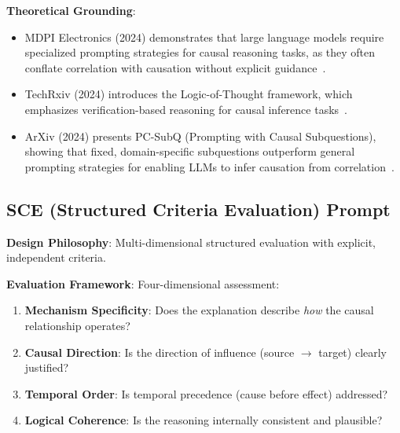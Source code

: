 \documentclass[11pt]{article}
\begin{document}
\textbf{Theoretical Grounding}:
\begin{itemize}[noitemsep]
    \item MDPI Electronics (2024) demonstrates that large language models require specialized prompting strategies for causal reasoning tasks, as they often conflate correlation with causation without explicit guidance~\cite{mdpi2024}.
    \item TechRxiv (2024) introduces the Logic-of-Thought framework, which emphasizes verification-based reasoning for causal inference tasks~\cite{techrxiv2024}.
    \item ArXiv (2024) presents PC-SubQ (Prompting with Causal Subquestions), showing that fixed, domain-specific subquestions outperform general prompting strategies for enabling LLMs to infer causation from correlation~\cite{arxiv2024pcsubq}.
\end{itemize}

\subsection{SCE (Structured Criteria Evaluation) Prompt}

\textbf{Design Philosophy}: Multi-dimensional structured evaluation with explicit, independent criteria.

\textbf{Evaluation Framework}: Four-dimensional assessment:
\begin{enumerate}[noitemsep]
    \item \textbf{Mechanism Specificity}: Does the explanation describe \textit{how} the causal relationship operates?
    \item \textbf{Causal Direction}: Is the direction of influence (source $\rightarrow$ target) clearly justified?
    \item \textbf{Temporal Order}: Is temporal precedence (cause before effect) addressed?
    \item \textbf{Logical Coherence}: Is the reasoning internally consistent and plausible?
\end{enumerate}
\end{document}
